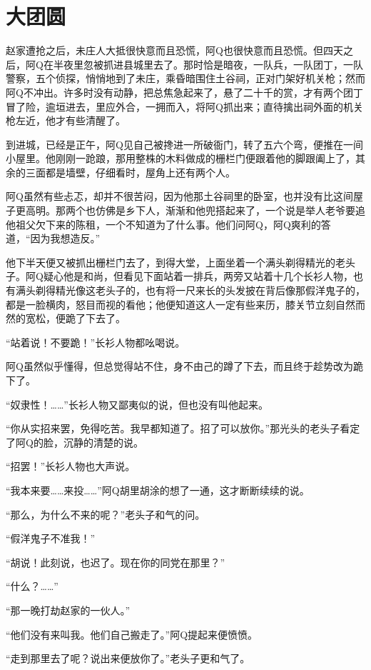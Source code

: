 \documentclass[12pt,UTF8]{ctexbook}
\begin{document}
\chapter{大团圆}

赵家遭抢之后，未庄人大抵很快意而且恐慌，阿Q也很快意而且恐慌。但四天之后，阿Q在半夜里忽被抓进县城里去了。那时恰是暗夜，一队兵，一队团丁，一队警察，五个侦探，悄悄地到了未庄，乘昏暗围住土谷祠，正对门架好机关枪；然而阿Q不冲出。许多时没有动静，把总焦急起来了，悬了二十千的赏，才有两个团丁冒了险，逾垣进去，里应外合，一拥而入，将阿Q抓出来；直待擒出祠外面的机关枪左近，他才有些清醒了。

到进城，已经是正午，阿Q见自己被搀进一所破衙门，转了五六个弯，便推在一间小屋里。他刚刚一跄踉，那用整株的木料做成的栅栏门便跟着他的脚跟阖上了，其余的三面都是墙壁，仔细看时，屋角上还有两个人。

阿Q虽然有些忐忑，却并不很苦闷，因为他那土谷祠里的卧室，也并没有比这间屋子更高明。那两个也仿佛是乡下人，渐渐和他兜搭起来了，一个说是举人老爷要追他祖父欠下来的陈租，一个不知道为了什么事。他们问阿Q，阿Q爽利的答道，“因为我想造反。”

他下半天便又被抓出栅栏门去了，到得大堂，上面坐着一个满头剃得精光的老头子。阿Q疑心他是和尚，但看见下面站着一排兵，两旁又站着十几个长衫人物，也有满头剃得精光像这老头子的，也有将一尺来长的头发披在背后像那假洋鬼子的，都是一脸横肉，怒目而视的看他；他便知道这人一定有些来历，膝关节立刻自然而然的宽松，便跪了下去了。

“站着说！不要跪！”长衫人物都吆喝说。

阿Q虽然似乎懂得，但总觉得站不住，身不由己的蹲了下去，而且终于趁势改为跪下了。

“奴隶性！……”长衫人物又鄙夷似的说，但也没有叫他起来。

“你从实招来罢，免得吃苦。我早都知道了。招了可以放你。”那光头的老头子看定了阿Q的脸，沉静的清楚的说。

“招罢！”长衫人物也大声说。

“我本来要……来投……”阿Q胡里胡涂的想了一通，这才断断续续的说。

“那么，为什么不来的呢？”老头子和气的问。

“假洋鬼子不准我！”

“胡说！此刻说，也迟了。现在你的同党在那里？”

“什么？……”

“那一晚打劫赵家的一伙人。”

“他们没有来叫我。他们自己搬走了。”阿Q提起来便愤愤。

“走到那里去了呢？说出来便放你了。”老头子更和气了。
\end{document}
